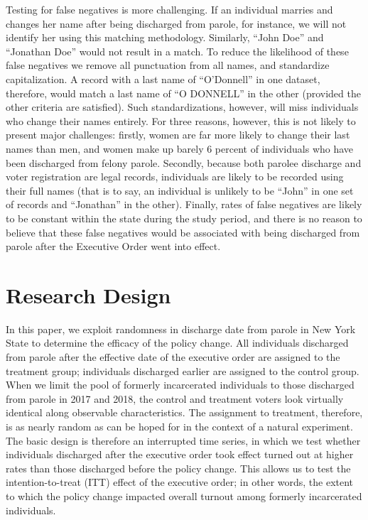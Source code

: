 \documentclass[
  12pt,
]{article}
\begin{document}
Testing for false negatives is more challenging. If an individual marries and changes her name after being discharged from parole, for instance, we will not identify her using this matching methodology. Similarly, ``John Doe'' and ``Jonathan Doe'' would not result in a match. To reduce the likelihood of these false negatives we remove all punctuation from all names, and standardize capitalization. A record with a last name of ``O'Donnell'' in one dataset, therefore, would match a last name of ``O DONNELL'' in the other (provided the other criteria are satisfied). Such standardizations, however, will miss individuals who change their names entirely. For three reasons, however, this is not likely to present major challenges: firstly, women are far more likely to change their last names than men, and women make up barely 6 percent of individuals who have been discharged from felony parole. Secondly, because both parolee discharge and voter registration are legal records, individuals are likely to be recorded using their full names (that is to say, an individual is unlikely to be ``John'' in one set of records and ``Jonathan'' in the other). Finally, rates of false negatives are likely to be constant within the state during the study period, and there is no reason to believe that these false negatives would be associated with being discharged from parole after the Executive Order went into effect.

\hypertarget{research-design}{%
\section*{Research Design}\label{research-design}}

In this paper, we exploit randomness in discharge date from parole in New York State to determine the efficacy of the policy change. All individuals discharged from parole after the effective date of the executive order are assigned to the treatment group; individuals discharged earlier are assigned to the control group. When we limit the pool of formerly incarcerated individuals to those discharged from parole in 2017 and 2018, the control and treatment voters look virtually identical along observable characteristics. The assignment to treatment, therefore, is as nearly random as can be hoped for in the context of a natural experiment. The basic design is therefore an interrupted time series, in which we test whether individuals discharged after the executive order took effect turned out at higher rates than those discharged before the policy change. This allows us to test the intention-to-treat (ITT) effect of the executive order; in other words, the extent to which the policy change impacted overall turnout among formerly incarcerated individuals.
\end{document}
